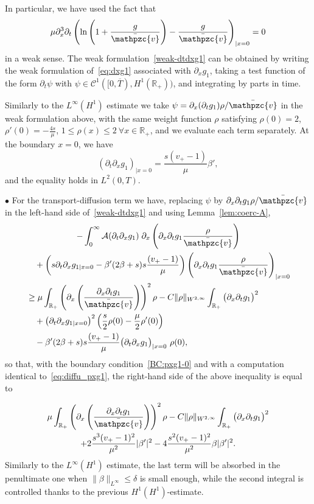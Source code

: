 \documentclass[AHL,Unicode,longabstracts,published]{cedram}
\newcommand{\R}{\mathbb{R}}
\newcommand{\p}{\partial}
\newcommand{\bv}{\bar{\mathpzc{v}}}
\newcommand{\cA}{\mathcal A}
\newcommand{\cC}{\mathcal C}
\let\oldforall\forall
\renewcommand*{\forall}{\mathrel{\oldforall}}
\begin{document}
In particular, we have used the fact that
\[
\mu \p_x^3\p_t \left(\ln \left(1+ \dfrac{g}{\bv}\right) - \dfrac{g}{\bv} \right)_{|x=0}=0
\]
in a weak sense. The weak formulation~\eqref{weak-dtdxg1} can be obtained by writing the weak formulation of~\eqref{eq:dxg1} associated with $\p_x g_1$, taking a test function of the form $\p_t \psi$ with $\psi \in \cC^1([0,\overline{T}), H^1(\R_+))$, and integrating by parts in time.



Similarly to the $L^\infty(H^1)$ estimate we take $\psi=\partial_x(\partial_t g_1) \rho / \bv$ in the weak formulation above, with the same weight function $\rho$ satisfying $\rho(0)=2$, $\rho'(0)=-\frac{4s}{\mu}$, $1\leq \rho(x)\leq 2~\forall x\in \R_+$, and we evaluate each term separately. At the boundary $x=0$, we have
\begin{equation}\label{BC:pxg1-0}
(\partial_t \partial_x g_1)_{|x=0} = \dfrac{s(v_+-1)}{\mu} \beta',
\end{equation}
and the equality holds in $L^2(0,T)$.


\noindent $\bullet$ For the transport-diffusion term we have, replacing $\psi$ by $\partial_x\partial_t g_1 \rho / \bv$ in the left-hand side of~\eqref{weak-dtdxg1} and using Lemma~\ref{lem:coerc-A},
\begin{multline*}
-\int_0^\infty \cA(\p_t\p_x g_1)\; \p_x \left(\partial_x\partial_t g_1 \frac{\rho}{\bv}\right) \\
\begin{aligned}
&\quad+\left(s\p_t\p_x g_{1|x=0} - \beta'(2\beta +s)s \dfrac{(v_+-1)}{\mu}\right)\left(\partial_x\partial_t g_1 \frac{\rho}{\bv}\right)_{|x=0}\\
& \geq \mu \int_{\R_+} \left(\partial_x \left(\dfrac{\partial_x \partial_t g_1}{\bv} \right) \right)^2 \rho - C \|\rho\|_{W^{2,\infty}} \int_{\R_+} \big(\partial_x \partial_t g_1\big)^2 \\
& \quad + \left(\partial_t \p_x g_{1|x=0}\right)^2 \left(\frac{s}{2} \rho(0)- \frac{\mu}{2}\rho'(0) \right)\\
& \quad - \beta'(2\beta +s)s \dfrac{(v_+-1)}{\mu} \big(\partial_t \partial_x g_1\big)_{|x=0} \ \rho(0),
\end{aligned}
\end{multline*}
so that, with the boundary condition~\eqref{BC:pxg1-0} and with a computation identical to~\eqref{eq:diffu_pxg1}, the right-hand side of the above inequality is equal to

\begin{multline*}
 \mu \int_{\R_+} \left(\partial_x \left(\dfrac{\partial_x \partial_t g_1}{\bv} \right) \right)^2 \rho - C \|\rho\|_{W^{2,\infty}} \int_{\R_+} \big(\partial_x \partial_t g_1\big)^2 \\
+ 2\dfrac{s^3 (v_+-1)^2}{\mu^2} |\beta'|^2 - 4 \dfrac{s^2(v_+-1)^2}{\mu^2} \beta |\beta'|^2.
\end{multline*}
Similarly to the $L^\infty(H^1)$ estimate, the last term will be absorbed in the penultimate one when $\|\beta\|_{L^\infty} \leq \delta$ is small enough, while the second integral is controlled thanks to the previous $H^1(H^1)$-estimate.
\end{document}
